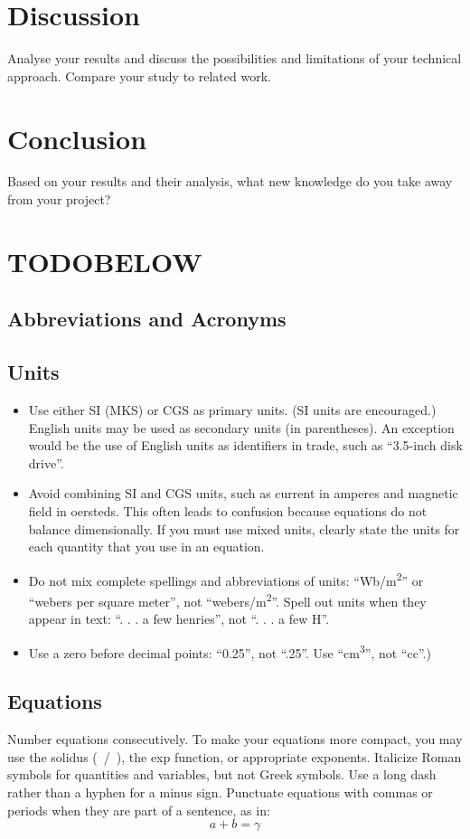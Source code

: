 \documentclass[conference]{IEEEtran}
\begin{document}
\section{Discussion}
Analyse your results and discuss the possibilities and limitations of
your technical approach. Compare your study to related work.

\section{Conclusion}
Based on your results and their analysis, what new knowledge do you
take away from your project?

\section{TODOBELOW}

\subsection{Abbreviations and Acronyms}\label{AA}

\subsection{Units}
\begin{itemize}
\item Use either SI (MKS) or CGS as primary units. (SI units are encouraged.) English units may be used as secondary units (in parentheses). An exception would be the use of English units as identifiers in trade, such as ``3.5-inch disk drive''.
\item Avoid combining SI and CGS units, such as current in amperes and magnetic field in oersteds. This often leads to confusion because equations do not balance dimensionally. If you must use mixed units, clearly state the units for each quantity that you use in an equation.
\item Do not mix complete spellings and abbreviations of units: ``Wb/m\textsuperscript{2}'' or ``webers per square meter'', not ``webers/m\textsuperscript{2}''. Spell out units when they appear in text: ``. . . a few henries'', not ``. . . a few H''.
\item Use a zero before decimal points: ``0.25'', not ``.25''. Use ``cm\textsuperscript{3}'', not ``cc''.)
\end{itemize}

\subsection{Equations}
Number equations consecutively. To make your 
equations more compact, you may use the solidus (~/~), the exp function, or 
appropriate exponents. Italicize Roman symbols for quantities and variables, 
but not Greek symbols. Use a long dash rather than a hyphen for a minus 
sign. Punctuate equations with commas or periods when they are part of a 
sentence, as in:
\begin{equation}
a+b=\gamma\label{eq}
\end{equation}
\end{document}
